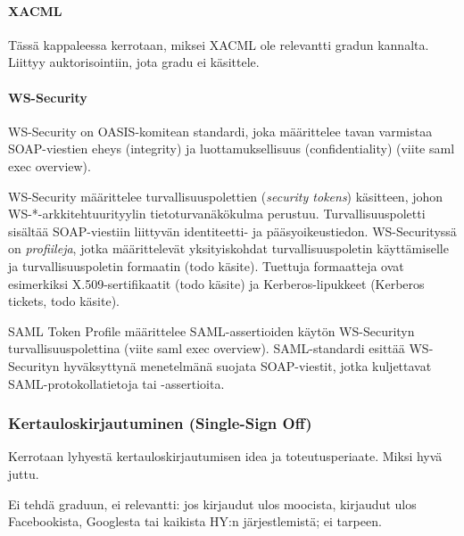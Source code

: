\documentclass[finnish,gradu]{tktltiki}
\begin{document}

  \paragraph{XACML} %
  \label{par:xacml}
  Tässä kappaleessa kerrotaan, miksei XACML ole relevantti gradun kannalta. Liittyy auktorisointiin, jota gradu ei käsittele.


  \paragraph{WS-Security} %
  \label{par:ws_security}
  WS-Security on OASIS-komitean standardi, joka määrittelee tavan varmistaa SOAP-viestien eheys (integrity) ja luottamuksellisuus (confidentiality) (viite saml exec overview).

  WS-Security määrittelee turvallisuuspolettien (\emph{security tokens}) käsitteen, johon WS-*-arkkitehtuurityylin tietoturvanäkökulma perustuu.
  Turvallisuuspoletti sisältää SOAP-viestiin liittyvän identiteetti- ja pääsyoikeustiedon.
  WS-Securityssä on \emph{profiileja}, jotka määrittelevät yksityiskohdat turvallisuuspoletin käyttämiselle ja turvallisuuspoletin formaatin (todo käsite).
  Tuettuja formaatteja ovat esimerkiksi X.509-sertifikaatit (todo käsite) ja Kerberos-lipukkeet (Kerberos tickets, todo käsite).

  SAML Token Profile määrittelee SAML-assertioiden käytön WS-Securityn turvallisuuspolettina (viite saml exec overview).
  SAML-standardi esittää WS-Securityn hyväksyttynä menetelmänä suojata SOAP-viestit, jotka kuljettavat SAML-protokollatietoja tai -assertioita.



  \subsubsection{Kertauloskirjautuminen (Single-Sign Off)} %
  \label{ssub:kertauloskirjautuminen}
  Kerrotaan lyhyestä kertauloskirjautumisen idea ja toteutusperiaate. Miksi hyvä juttu.

  Ei tehdä graduun, ei relevantti: jos kirjaudut ulos moocista, kirjaudut ulos Facebookista, Googlesta tai kaikista HY:n järjestlemistä; ei tarpeen.
\end{document}
